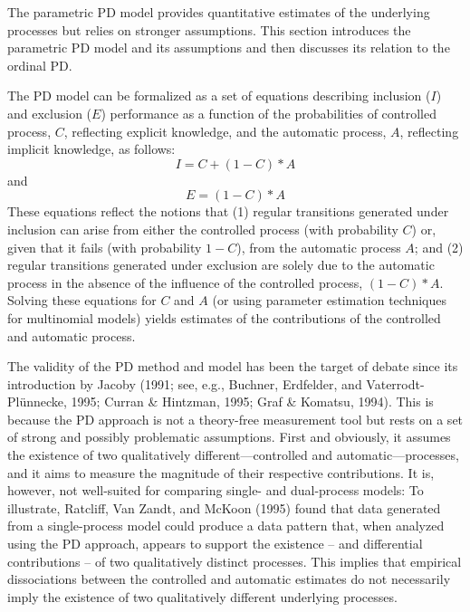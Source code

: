 \documentclass[floatsintext,doc]{apa6}
\theoremstyle{definition}
\theoremstyle{definition}
\theoremstyle{definition}
\theoremstyle{remark}
\begin{document}
The parametric PD model provides quantitative estimates of the
underlying processes but relies on stronger assumptions. This section
introduces the parametric PD model and its assumptions and then
discusses its relation to the ordinal PD.

The PD model can be formalized as a set of equations describing
inclusion (\(I\)) and exclusion (\(E\)) performance as a function of the
probabilities of controlled process, \(C\), reflecting explicit
knowledge, and the automatic process, \(A\), reflecting implicit
knowledge, as follows: \[I=C+(1-C)*A\] and \[E=(1-C)*A\] These equations
reflect the notions that (1) regular transitions generated under
inclusion can arise from either the controlled process (with probability
\(C\)) or, given that it fails (with probability \(1-C\)), from the
automatic process \(A\); and (2) regular transitions generated under
exclusion are solely due to the automatic process in the absence of the
influence of the controlled process, \((1-C)*A\). Solving these
equations for \(C\) and \(A\) (or using parameter estimation techniques
for multinomial models) yields estimates of the contributions of the
controlled and automatic process.

The validity of the PD method and model has been the target of debate
since its introduction by Jacoby (1991; see, e.g., Buchner, Erdfelder,
and Vaterrodt-Plünnecke, 1995; Curran \& Hintzman, 1995; Graf \&
Komatsu, 1994). This is because the PD approach is not a theory-free
measurement tool but rests on a set of strong and possibly problematic
assumptions. First and obviously, it assumes the existence of two
qualitatively different---controlled and automatic---processes, and it
aims to measure the magnitude of their respective contributions. It is,
however, not well-suited for comparing single- and dual-process models:
To illustrate, Ratcliff, Van Zandt, and McKoon (1995) found that data
generated from a single-process model could produce a data pattern that,
when analyzed using the PD approach, appears to support the existence --
and differential contributions -- of two qualitatively distinct
processes. This implies that empirical dissociations between the
controlled and automatic estimates do not necessarily imply the
existence of two qualitatively different underlying processes.
\end{document}
